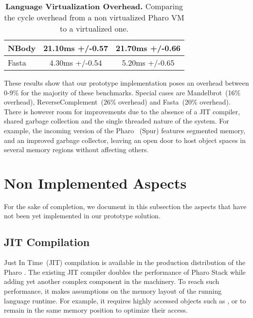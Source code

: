 \begin{table}[ht]
\begin{tabular}{|l|c|c|}
		NBody & 21.10ms +/-0.57 & 21.70ms +/-0.66 \\\hline%
		Fasta & 4.30ms +/-0.54 & 5.20ms +/-0.65 \\\hline%
 	\end{tabular}
	\vspace*{0.2cm}
 	\caption{\small\textbf{Language Virtualization Overhead.} Comparing the cycle overhead from a non virtualized Pharo VM to a virtualized one.\label{tb:benchmarks}}
 \end{table}

These results show that our prototype implementation poses an overhead between 0-9\% for the majority of these benchmarks. Special cases are Mandelbrot~(16\% overhead), ReverseComplement~(26\% overhead) and Fasta~(20\% overhead).
There is however room for improvements due to the absence of a JIT compiler, shared garbage collection and the single threaded nature of the system.
For example, the incoming version of the Pharo \VM~(Spur) features segmented memory, and an improved garbage collector, leaving an open door to host object spaces in several memory regions without affecting others. 


\section{Non Implemented Aspects} \label{sec:not_yet_implemented}
 
For the sake of completion, we document in this subsection the aspects that have not been yet implemented in our prototype solution.

\subsection{JIT Compilation}

Just In Time~(JIT) compilation is available in the production distribution of the Pharo \VM. The existing JIT compiler doubles the performance of Pharo Stack \VM while adding yet another complex component in the \VM machinery. To reach such performance, it makes assumptions on the memory layout of the running language runtime. For example, it requires highly accessed objects such as ,  or  to remain in the same memory position to optimize their access.

